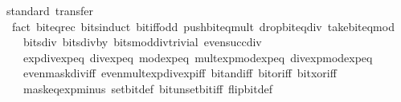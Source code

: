 \begin{isabellebody}
\ {\isacharparenleft}{\kern0pt}standard{\isacharsemicolon}{\kern0pt}\ transfer{\isacharparenright}{\kern0pt}\isanewline
\ \ {\isacharparenleft}{\kern0pt}fact\ bit{\isacharunderscore}{\kern0pt}eq{\isacharunderscore}{\kern0pt}rec\ bits{\isacharunderscore}{\kern0pt}induct\ bit{\isacharunderscore}{\kern0pt}iff{\isacharunderscore}{\kern0pt}odd\ push{\isacharunderscore}{\kern0pt}bit{\isacharunderscore}{\kern0pt}eq{\isacharunderscore}{\kern0pt}mult\ drop{\isacharunderscore}{\kern0pt}bit{\isacharunderscore}{\kern0pt}eq{\isacharunderscore}{\kern0pt}div\ take{\isacharunderscore}{\kern0pt}bit{\isacharunderscore}{\kern0pt}eq{\isacharunderscore}{\kern0pt}mod\isanewline
\ \ \ \ bits{\isacharunderscore}{\kern0pt}div{\isacharunderscore}{\kern0pt}{}\ bits{\isacharunderscore}{\kern0pt}div{\isacharunderscore}{\kern0pt}by{\isacharunderscore}{\kern0pt}{}\ bits{\isacharunderscore}{\kern0pt}mod{\isacharunderscore}{\kern0pt}div{\isacharunderscore}{\kern0pt}trivial\ even{\isacharunderscore}{\kern0pt}succ{\isacharunderscore}{\kern0pt}div{\isacharunderscore}{\kern0pt}{}\isanewline
\ \ \ \ exp{\isacharunderscore}{\kern0pt}div{\isacharunderscore}{\kern0pt}exp{\isacharunderscore}{\kern0pt}eq\ div{\isacharunderscore}{\kern0pt}exp{\isacharunderscore}{\kern0pt}eq\ mod{\isacharunderscore}{\kern0pt}exp{\isacharunderscore}{\kern0pt}eq\ mult{\isacharunderscore}{\kern0pt}exp{\isacharunderscore}{\kern0pt}mod{\isacharunderscore}{\kern0pt}exp{\isacharunderscore}{\kern0pt}eq\ div{\isacharunderscore}{\kern0pt}exp{\isacharunderscore}{\kern0pt}mod{\isacharunderscore}{\kern0pt}exp{\isacharunderscore}{\kern0pt}eq\isanewline
\ \ \ \ even{\isacharunderscore}{\kern0pt}mask{\isacharunderscore}{\kern0pt}div{\isacharunderscore}{\kern0pt}iff\ even{\isacharunderscore}{\kern0pt}mult{\isacharunderscore}{\kern0pt}exp{\isacharunderscore}{\kern0pt}div{\isacharunderscore}{\kern0pt}exp{\isacharunderscore}{\kern0pt}iff\ bit{\isacharunderscore}{\kern0pt}and{\isacharunderscore}{\kern0pt}iff\ bit{\isacharunderscore}{\kern0pt}or{\isacharunderscore}{\kern0pt}iff\ bit{\isacharunderscore}{\kern0pt}xor{\isacharunderscore}{\kern0pt}iff\isanewline
\ \ \ \ mask{\isacharunderscore}{\kern0pt}eq{\isacharunderscore}{\kern0pt}exp{\isacharunderscore}{\kern0pt}minus{\isacharunderscore}{\kern0pt}{}\ set{\isacharunderscore}{\kern0pt}bit{\isacharunderscore}{\kern0pt}def\ bit{\isacharunderscore}{\kern0pt}unset{\isacharunderscore}{\kern0pt}bit{\isacharunderscore}{\kern0pt}iff\ flip{\isacharunderscore}{\kern0pt}bit{\isacharunderscore}{\kern0pt}def{\isacharparenright}{\kern0pt}{\isacharplus}{\kern0pt}%

\end{isabellebody}
